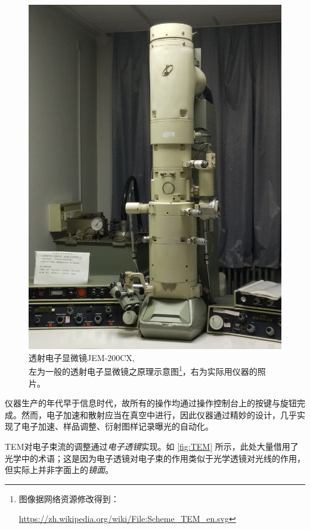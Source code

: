 \documentclass[aps,pre,12pt,preprint,%
	onecolumn,showpacs,showkeys,nofootinbib]{revtex4-1}
\begin{document}
\begin{figure}[!ht]
	\includegraphics[height=\TEMfigHeight]{RealTEM}
	\caption[透射电子显微镜]{透射电子显微镜\textup{JEM-200CX}, \\
		左为一般的透射电子显微镜之原理示意图\footnote{%
			图像据网络资源修改得到：\par
			\noindent%
			\url{https://zh.wikipedia.org/wiki/File:Scheme_TEM_en.svg}%
		}，右为实际用仪器的照片。
		\vspace{1ex}}
	\label{fig:TEM}
	\end{figure}
	
	仪器生产的年代早于信息时代，故所有的操作均通过操作控制台上的按键与旋钮完成。然而，电子加速和散射应当在真空中进行，因此仪器通过精妙的设计，几乎实现了电子加速、样品调整、衍射图样记录曝光的自动化。
	
	TEM对电子束流的调整通过\textit{电子透镜}实现。如 \autoref{fig:TEM} 所示，此处大量借用了光学中的术语；这是因为电子透镜对电子束的作用类似于光学透镜对光线的作用，但实际上并非字面上的\textit{镜面}。
	
\end{document}
